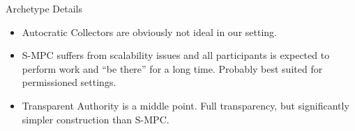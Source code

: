 \begin{frame}{Archetype Details}
    \begin{itemize}
			\item Autocratic Collectors are obviously not ideal in our setting.
			\item S-MPC suffers from scalability issues and all participants is expected to perform work and ``be there'' for a long time. Probably best suited for permissioned settings.
			\item Transparent Authority is a middle point. Full transparency, but significantly simpler construction than S-MPC.
		\end{itemize}
\end{frame}
